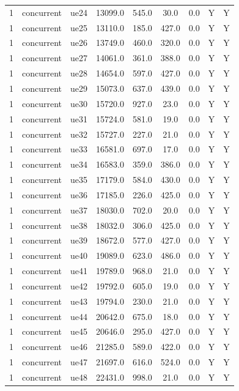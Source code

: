 \begin{table}[ht]
\begin{tabular}{|c|c|c|c|c|c|c|c|c|}
1 & concurrent & ue24 & 13099.0 & 545.0 & 30.0 & 0.0 & Y & Y \\
1 & concurrent & ue25 & 13110.0 & 185.0 & 427.0 & 0.0 & Y & Y \\
1 & concurrent & ue26 & 13749.0 & 460.0 & 320.0 & 0.0 & Y & Y \\
1 & concurrent & ue27 & 14061.0 & 361.0 & 388.0 & 0.0 & Y & Y \\
1 & concurrent & ue28 & 14654.0 & 597.0 & 427.0 & 0.0 & Y & Y \\
1 & concurrent & ue29 & 15073.0 & 637.0 & 439.0 & 0.0 & Y & Y \\
1 & concurrent & ue30 & 15720.0 & 927.0 & 23.0 & 0.0 & Y & Y \\
1 & concurrent & ue31 & 15724.0 & 581.0 & 19.0 & 0.0 & Y & Y \\
1 & concurrent & ue32 & 15727.0 & 227.0 & 21.0 & 0.0 & Y & Y \\
1 & concurrent & ue33 & 16581.0 & 697.0 & 17.0 & 0.0 & Y & Y \\
1 & concurrent & ue34 & 16583.0 & 359.0 & 386.0 & 0.0 & Y & Y \\
1 & concurrent & ue35 & 17179.0 & 584.0 & 430.0 & 0.0 & Y & Y \\
1 & concurrent & ue36 & 17185.0 & 226.0 & 425.0 & 0.0 & Y & Y \\
1 & concurrent & ue37 & 18030.0 & 702.0 & 20.0 & 0.0 & Y & Y \\
1 & concurrent & ue38 & 18032.0 & 306.0 & 425.0 & 0.0 & Y & Y \\
1 & concurrent & ue39 & 18672.0 & 577.0 & 427.0 & 0.0 & Y & Y \\
1 & concurrent & ue40 & 19089.0 & 623.0 & 486.0 & 0.0 & Y & Y \\
1 & concurrent & ue41 & 19789.0 & 968.0 & 21.0 & 0.0 & Y & Y \\
1 & concurrent & ue42 & 19792.0 & 605.0 & 19.0 & 0.0 & Y & Y \\
1 & concurrent & ue43 & 19794.0 & 230.0 & 21.0 & 0.0 & Y & Y \\
1 & concurrent & ue44 & 20642.0 & 675.0 & 18.0 & 0.0 & Y & Y \\
1 & concurrent & ue45 & 20646.0 & 295.0 & 427.0 & 0.0 & Y & Y \\
1 & concurrent & ue46 & 21285.0 & 589.0 & 422.0 & 0.0 & Y & Y \\
1 & concurrent & ue47 & 21697.0 & 616.0 & 524.0 & 0.0 & Y & Y \\
1 & concurrent & ue48 & 22431.0 & 998.0 & 21.0 & 0.0 & Y & Y \\

\end{tabular}
\end{table}
